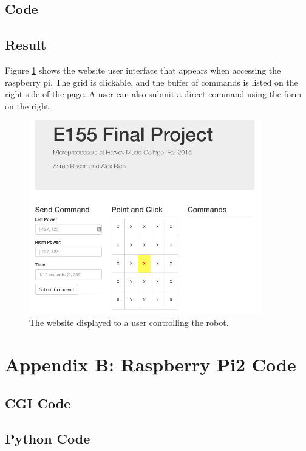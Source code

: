 \documentclass[11pt]{article}
\begin{document}
\subsection{Code}



\subsection{Result}

Figure \ref{fig:page} shows the website user interface that appears when accessing the raspberry pi. The grid is clickable, and the buffer of commands is listed on the right side of the page. A user can also submit a direct command using the form on the right.

\begin{figure}[!h]
\begin{center}
\includegraphics[width=0.9\textwidth]{page}
\end{center}
\caption{The website displayed to a user controlling the robot.}
\label{fig:page}
\end{figure}

\section{Appendix B: Raspberry Pi2 Code}
\subsection{CGI Code}

\subsection{Python Code}

\end{document}
